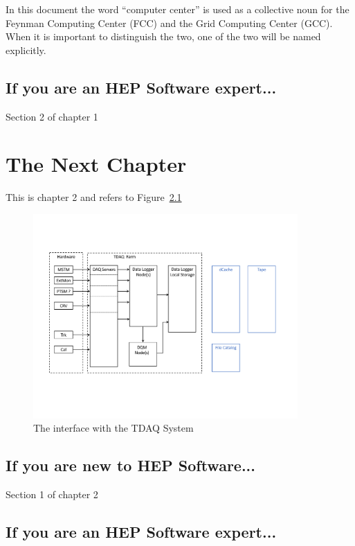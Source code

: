 In this document the word ``computer center'' is used as a collective noun for the
Feynman Computing Center (FCC) and the Grid Computing Center (GCC).
When it is important to distinguish the two, one of the two will be named explicitly.



\section{If you are an HEP Software expert...}

Section 2 of chapter 1

\chapter{The Next Chapter}
\label{ch:next_chapter}

This is chapter 2 and refers to Figure~\ref{fig:interfaceTDAQ}

\begin{figure}[tbp]
\centering
\includegraphics[width=0.9\textwidth]{figures/interface_with_TDAQ.pdf}
\caption{The interface with the TDAQ System}
\label{fig:interfaceTDAQ}
\end{figure}


\section{If you are new to HEP Software...}

Section 1 of chapter 2


\section{If you are an HEP Software expert...}

